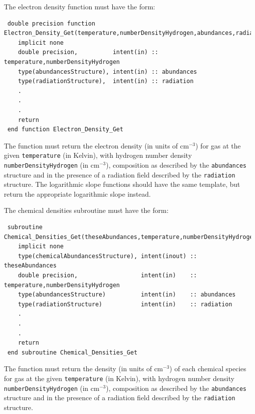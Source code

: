 The electron density function must have the form:
\begin{verbatim}
 double precision function Electron_Density_Get(temperature,numberDensityHydrogen,abundances,radiation)
    implicit none
    double precision,          intent(in) :: temperature,numberDensityHydrogen
    type(abundancesStructure), intent(in) :: abundances
    type(radiationStructure),  intent(in) :: radiation
    .
    .
    .
    return
 end function Electron_Density_Get
\end{verbatim}
The function must return the electron density (in units of cm$^{-3}$) for gas at the given {\tt temperature} (in Kelvin), with hydrogen number density {\tt numberDensityHydrogen} (in cm$^{-3}$), composition as described by the {\tt abundances} structure and in the presence of a radiation field described by the {\tt radiation} structure. The logarithmic slope functions should have the same template, but return the appropriate logarithmic slope instead.

The chemical densities subroutine must have the form:
\begin{verbatim}
 subroutine Chemical_Densities_Get(theseAbundances,temperature,numberDensityHydrogen,abundances,radiation)
    implicit none
    type(chemicalAbundancesStructure), intent(inout) :: theseAbundances
    double precision,                  intent(in)    :: temperature,numberDensityHydrogen
    type(abundancesStructure)          intent(in)    :: abundances
    type(radiationStructure)           intent(in)    :: radiation
    .
    .
    .
    return
 end subroutine Chemical_Densities_Get
\end{verbatim}
The function must return the density (in units of cm$^{-3}$) of each chemical species for gas at the given {\tt temperature} (in Kelvin), with hydrogen number density {\tt numberDensityHydrogen} (in cm$^{-3}$), composition as described by the {\tt abundances} structure and in the presence of a radiation field described by the {\tt radiation} structure.

